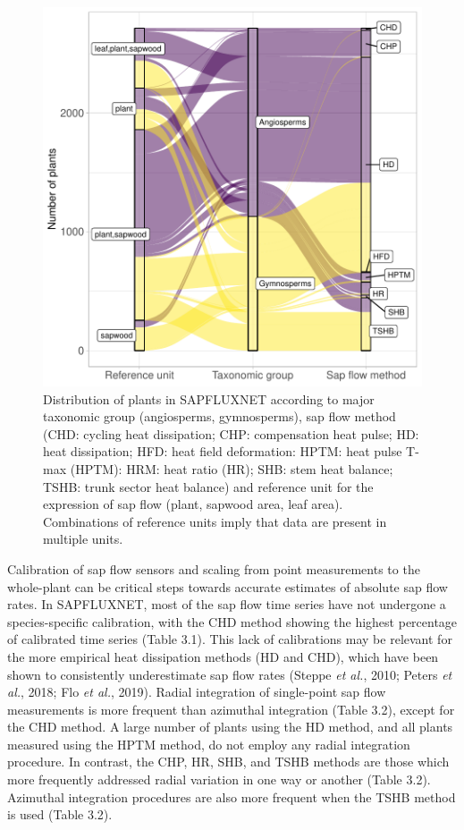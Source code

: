 \documentclass[11pt,twoside]{reedthesis}
\begin{document}
\setlength{\abovecaptionskip}{0pt}
\begin{figure}[hbt!]

{\centering \includegraphics[width=1\linewidth]{figure/CH3/Figure4} 

}

\caption[Distribution of plants according to major taxonomic group and sap flow method.]{Distribution of plants in SAPFLUXNET according to major taxonomic group (angiosperms, gymnosperms), sap flow method (CHD: cycling heat dissipation; CHP: compensation heat pulse; HD: heat dissipation; HFD: heat field deformation: HPTM: heat pulse T-max (HPTM): HRM: heat ratio (HR); SHB: stem heat balance; TSHB: trunk sector heat balance) and reference unit for the expression of sap flow (plant, sapwood area, leaf area). Combinations of reference units imply that data are present in multiple units.}\label{fig:Ch2plot4}
\end{figure}
Calibration of sap flow sensors and scaling from point measurements to
the whole-plant can be critical steps towards accurate estimates of
absolute sap flow rates. In SAPFLUXNET, most of the sap flow time series
have not undergone a species-specific calibration, with the CHD method
showing the highest percentage of calibrated time series (Table 3.1).
This lack of calibrations may be relevant for the more empirical heat
dissipation methods (HD and CHD), which have been shown to consistently
underestimate sap flow rates (Steppe \emph{et al.}, 2010; Peters
\emph{et al.}, 2018; Flo \emph{et al.}, 2019). Radial integration of
single-point sap flow measurements is more frequent than azimuthal
integration (Table 3.2), except for the CHD method. A large number of
plants using the HD method, and all plants measured using the HPTM
method, do not employ any radial integration procedure. In contrast, the
CHP, HR, SHB, and TSHB methods are those which more frequently addressed
radial variation in one way or another (Table 3.2). Azimuthal
integration procedures are also more frequent when the TSHB method is
used (Table 3.2).\par
\end{document}
